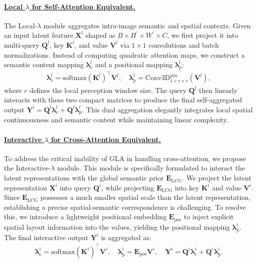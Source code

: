 \documentclass[runningheads]{llncs}
\begin{document}
\vspace{-0.5em}
\paragraph{\underline{Local $\lambda$ for Self-Attention Equivalent.}}
The Local-$\lambda$ module aggregates intra-image semantic and spatial contexts. Given an input latent feature $\mathbf{X}^l$ shaped as $B\times H^\prime\times W^\prime\times C$, we first project it into multi-query $\mathbf{Q}^l$, key $\mathbf{K}^l$, and value $\mathbf{V}^l$ via $1\times1$ convolutions and batch normalizations. Instead of computing quadratic attention maps, we construct a semantic content mapping $\boldsymbol{\lambda}^l_c$ and a positional mapping $\boldsymbol{\lambda}^l_p$:
\begin{equation}
\begin{gathered}
\boldsymbol{\lambda}^l_c = \mathrm{softmax}(\mathbf{K}^l)^\top \mathbf{V}^l, \quad
\boldsymbol{\lambda}^l_p = \mathrm{Conv3D}^{\text{pos}}_{1\times r\times r}(\mathbf{V}^l), 
\end{gathered}
\end{equation}
where $r$ defines the local perception window size. The query $\mathbf{Q}^l$ then linearly interacts with these two compact matrices to produce the final self-aggregated output $\mathbf{Y}^l = \mathbf{Q}^l \boldsymbol{\lambda}^l_c + \mathbf{Q}^l \boldsymbol{\lambda}^l_p$. This dual aggregation elegantly integrates local spatial continuousness and semantic content while maintaining linear complexity.

\vspace{-0.5em}
\paragraph{\underline{Interactive $\lambda$ for Cross-Attention Equivalent.}}
To address the critical inability of GLA in handling cross-attention, we propose the Interactive-$\lambda$ module. This module is specifically formulated to interact the latent representations with the global semantic prior $\mathbf{E}_\text{LCG}$. We project the latent representation $\mathbf{X}^i$ into query $\mathbf{Q}^i$, while projecting $\mathbf{E}_\text{LCG}$ into key $\mathbf{K}^i$ and value $\mathbf{V}^i$. 
Since $\mathbf{E}_\text{LCG}$ possesses a much smaller spatial scale than the latent representation, establishing a precise spatial-semantic correspondence is challenging. To resolve this, we introduce a lightweight positional embedding $\mathbf{E}_\text{pos}$ to inject explicit spatial layout information into the values, yielding the positional mapping $\boldsymbol{\lambda}^i_p$. The final interactive output $\mathbf{Y}^i$ is aggregated as:
\begin{equation}
\begin{gathered}
 \boldsymbol{\lambda}^i_c =  \mathrm{softmax}(\mathbf{K}^i)^\top \mathbf{V}^i, \quad
 \boldsymbol{\lambda}^i_p = \mathbf{E}_\text{pos} \mathbf{V}^i, \quad
 \mathbf{Y}^i = \mathbf{Q}^i \boldsymbol{\lambda}^i_c + \mathbf{Q}^i \boldsymbol{\lambda}^i_p.
\end{gathered}
\end{equation}
\end{document}
